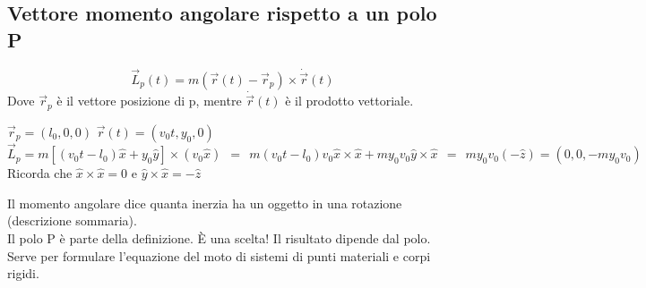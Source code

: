 \subsection{Vettore momento angolare rispetto a un polo P}
$$\vec{L}_p(t) = m(\vec{r}(t) - \vec{r}_p) \times \dot{\vec{r}}(t)$$
Dove $\vec{r}_p$ è il vettore posizione di p, mentre $\dot{\vec{r}}(t)$ è il prodotto vettoriale.
\begin{example}
    $\vec{r}_p = (l_0, 0, 0)$ \hspace{15pt} $\vec{r}(t) = (v_0t, y_0, 0)$\\
    $\vec{L}_p = m[(v_0t - l_0)\hat{x} + y_0\hat{y}] \times (v_0\hat{x}) \:\: = \:\: m(v_0t - l_0)v_0 \hat{x} \times \hat{x} + my_0v_0\hat{y}\times \hat{x} 
    \:\: = \:\: my_0v_0(-\hat{z}) = (0,0, -my_0v_0)$\\
    Ricorda che $\hat{x} \times \hat{x} = 0$ e $\hat{y} \times \hat{x} = -\hat{z}$
\end{example}
\hspace{-15pt}Il momento angolare dice quanta inerzia ha un oggetto in una rotazione (descrizione sommaria).\\
Il polo P è parte della definizione. È una scelta! Il risultato dipende dal polo.
Serve per formulare l'equazione del moto di sistemi di punti materiali e corpi rigidi.

